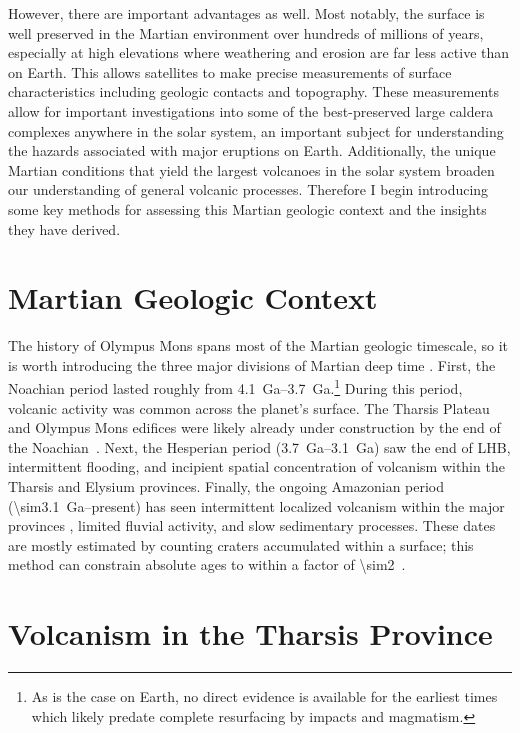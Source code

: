 However, there are important advantages as well. Most notably, the surface is well preserved in the Martian environment over hundreds of millions of years, especially at high elevations where weathering and erosion are far less active than on Earth. This allows satellites to make precise measurements of surface characteristics including geologic contacts and topography. These measurements allow for important investigations into some of the best-preserved large caldera complexes anywhere in the solar system, an important subject for understanding the hazards associated with major eruptions on Earth. Additionally, the unique Martian conditions that yield the largest volcanoes in the solar system broaden our understanding of general volcanic processes. Therefore I begin introducing some key methods for assessing this Martian geologic context and the insights they have derived.

\section{Martian Geologic Context}

The history of Olympus Mons spans most of the Martian geologic timescale, so it is worth introducing the three major divisions of Martian deep time \parencite{carr_geologic_2010}. First, the Noachian period lasted roughly from \qtyrange{4.1}{3.7}{Ga}.\footnote{As is the case on Earth, no direct evidence is available for the earliest times which likely predate complete resurfacing by impacts and magmatism.} During this period, volcanic activity was common across the planet's surface. The Tharsis Plateau and Olympus Mons edifices were likely already under construction by the end of the Noachian~\parencite[cf.][]{isherwood_volcanic_2013,broquet_gravitational_2019}. Next, the Hesperian period (\qtyrange{3.7}{3.1}{Ga}) saw the end of \acl{LHB}, intermittent flooding, and incipient spatial concentration of volcanism within the Tharsis and Elysium provinces. Finally, the ongoing Amazonian period (\qty{\sim3.1}{Ga}--present) has seen intermittent localized volcanism within the major provinces \parencite[e.g.,][]{grott_long-term_2013}, limited fluvial activity, and slow sedimentary processes. These dates are mostly estimated by counting craters accumulated within a surface; this method can constrain absolute ages to within a factor of \num{\sim2}~\parencite[e.g.,][]{kneissl_map-projection-independent_2011}.

\section{Volcanism in the Tharsis Province}

